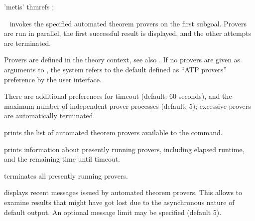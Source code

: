 \begin{isabellebody}
\begin{isamarkuptext}
\begin{rail}
  'metis' thmrefs
  ;
  \end{rail}

  \begin{description}

  \item \hyperlink{command.HOL.sledgehammer}{\mbox{}}~
  invokes the specified automated theorem provers on the first
  subgoal.  Provers are run in parallel, the first successful result
  is displayed, and the other attempts are terminated.

  Provers are defined in the theory context, see also \hyperlink{command.HOL.print-atps}{\mbox{}}.  If no provers are given as arguments to \hyperlink{command.HOL.sledgehammer}{\mbox{}}, the system refers to the default defined as
  ``ATP provers'' preference by the user interface.

  There are additional preferences for timeout (default: 60 seconds),
  and the maximum number of independent prover processes (default: 5);
  excessive provers are automatically terminated.

  \item \hyperlink{command.HOL.print-atps}{\mbox{}} prints the list of automated
  theorem provers available to the \hyperlink{command.HOL.sledgehammer}{\mbox{}}
  command.

  \item \hyperlink{command.HOL.atp-info}{\mbox{}} prints information about presently
  running provers, including elapsed runtime, and the remaining time
  until timeout.

  \item \hyperlink{command.HOL.atp-kill}{\mbox{}} terminates all presently running
  provers.

  \item \hyperlink{command.HOL.atp-messages}{\mbox{}} displays recent messages issued
  by automated theorem provers.  This allows to examine results that
  might have got lost due to the asynchronous nature of default
  \hyperlink{command.HOL.sledgehammer}{\mbox{}} output.  An optional message limit may
  be specified (default 5).


\end{description}
\end{isamarkuptext}
\end{isabellebody}
